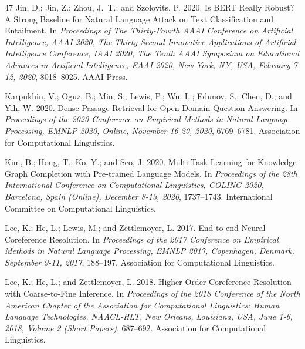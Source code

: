 \documentclass[letterpaper]{article} %
\begin{document}
\begin{thebibliography}{47}
    Jin, D.; Jin, Z.; Zhou, J.~T.; and Szolovits, P. 2020.
    \newblock Is {BERT} Really Robust? {A} Strong Baseline for Natural Language Attack on Text Classification and Entailment.
    \newblock In \emph{Proceedings of The Thirty-Fourth {AAAI} Conference on Artificial Intelligence, {AAAI} 2020, The Thirty-Second Innovative Applications of Artificial Intelligence Conference, {IAAI} 2020, The Tenth {AAAI} Symposium on Educational Advances in Artificial Intelligence, {EAAI} 2020, New York, NY, USA, February 7-12, 2020}, 8018--8025. {AAAI} Press.
    
    Karpukhin, V.; Oguz, B.; Min, S.; Lewis, P.; Wu, L.; Edunov, S.; Chen, D.; and Yih, W. 2020.
    \newblock Dense Passage Retrieval for Open-Domain Question Answering.
    \newblock In \emph{Proceedings of the 2020 Conference on Empirical Methods in Natural Language Processing, {EMNLP} 2020, Online, November 16-20, 2020}, 6769--6781. Association for Computational Linguistics.
    
    Kim, B.; Hong, T.; Ko, Y.; and Seo, J. 2020.
    \newblock Multi-Task Learning for Knowledge Graph Completion with Pre-trained Language Models.
    \newblock In \emph{Proceedings of the 28th International Conference on Computational Linguistics, {COLING} 2020, Barcelona, Spain (Online), December 8-13, 2020}, 1737--1743. International Committee on Computational Linguistics.
    
    Lee, K.; He, L.; Lewis, M.; and Zettlemoyer, L. 2017.
    \newblock End-to-end Neural Coreference Resolution.
    \newblock In \emph{Proceedings of the 2017 Conference on Empirical Methods in Natural Language Processing, {EMNLP} 2017, Copenhagen, Denmark, September 9-11, 2017}, 188--197. Association for Computational Linguistics.
    
    Lee, K.; He, L.; and Zettlemoyer, L. 2018.
    \newblock Higher-Order Coreference Resolution with Coarse-to-Fine Inference.
    \newblock In \emph{Proceedings of the 2018 Conference of the North American Chapter of the Association for Computational Linguistics: Human Language Technologies, NAACL-HLT, New Orleans, Louisiana, USA, June 1-6, 2018, Volume 2 (Short Papers)}, 687--692. Association for Computational Linguistics.
    

\end{thebibliography}
\end{document}
